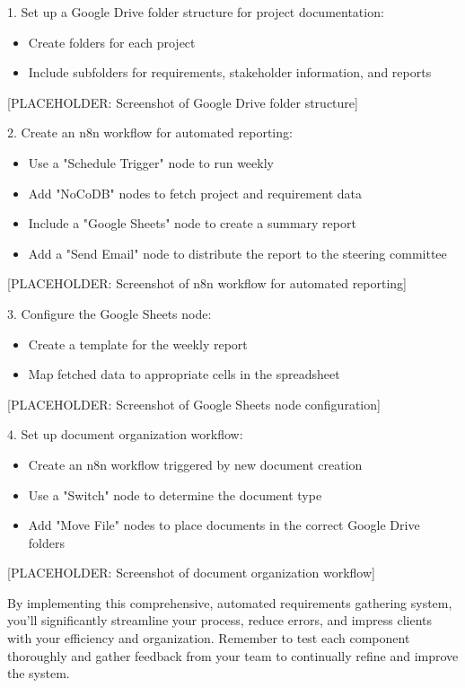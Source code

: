 1. Set up a Google Drive folder structure for project documentation:
\begin{itemize}
    \item Create folders for each project
    \item Include subfolders for requirements, stakeholder information, and reports
\end{itemize}

[PLACEHOLDER: Screenshot of Google Drive folder structure]

2. Create an n8n workflow for automated reporting:
\begin{itemize}
    \item Use a "Schedule Trigger" node to run weekly
    \item Add "NoCoDB" nodes to fetch project and requirement data
    \item Include a "Google Sheets" node to create a summary report
    \item Add a "Send Email" node to distribute the report to the steering committee
\end{itemize}

[PLACEHOLDER: Screenshot of n8n workflow for automated reporting]

3. Configure the Google Sheets node:
\begin{itemize}
    \item Create a template for the weekly report
    \item Map fetched data to appropriate cells in the spreadsheet
\end{itemize}

[PLACEHOLDER: Screenshot of Google Sheets node configuration]

4. Set up document organization workflow:
\begin{itemize}
    \item Create an n8n workflow triggered by new document creation
    \item Use a "Switch" node to determine the document type
    \item Add "Move File" nodes to place documents in the correct Google Drive folders
\end{itemize}

[PLACEHOLDER: Screenshot of document organization workflow]

By implementing this comprehensive, automated requirements gathering system, you'll significantly streamline your process, reduce errors, and impress clients with your efficiency and organization. Remember to test each component thoroughly and gather feedback from your team to continually refine and improve the system.


